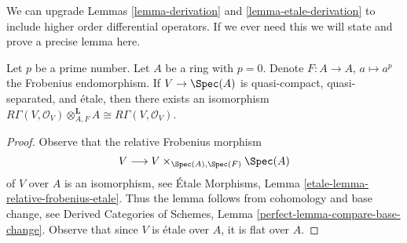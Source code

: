\begin{remark}
\label{remark-higher-order-operators}
We can upgrade Lemmas \ref{lemma-derivation} and \ref{lemma-etale-derivation}
to include higher order differential operators.
If we ever need this we will state and prove a
precise lemma here.
\end{remark}

\begin{lemma}
\label{lemma-etale-frobenius}
Let $p$ be a prime number. Let $A$ be a ring with $p = 0$.
Denote $F : A \to A$, $a \mapsto a^p$ the Frobenius endomorphism.
If $V \to \Spec(A)$ is quasi-compact, quasi-separated,
and \'etale, then there exists an isomorphism
$R\Gamma(V, \mathcal{O}_V) \otimes_{A, F}^\mathbf{L} A \cong
R\Gamma(V, \mathcal{O}_V)$.
\end{lemma}

\begin{proof}
Observe that the relative Frobenius morphism
$$
V \longrightarrow V \times_{\Spec(A), \Spec(F)} \Spec(A)
$$
of $V$ over $A$ is an isomorphism, see
\'Etale Morphisms, Lemma \ref{etale-lemma-relative-frobenius-etale}.
Thus the lemma follows from cohomology and base change, see
Derived Categories of Schemes, Lemma
\ref{perfect-lemma-compare-base-change}.
Observe that since $V$ is \'etale over $A$, it is flat over $A$.
\end{proof}











